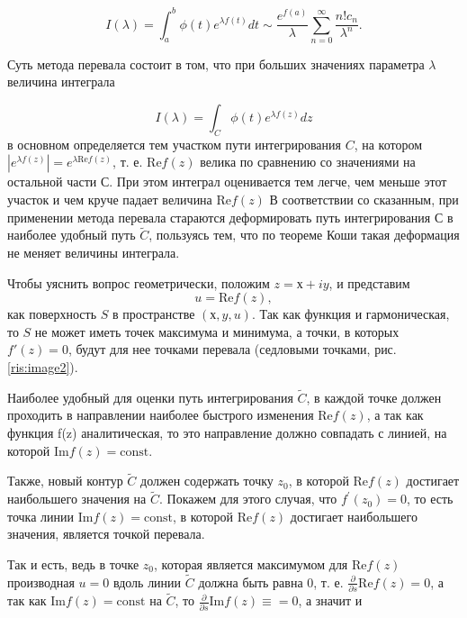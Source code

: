 \documentclass[%
bachelor,    %
natbib,      %
subf,        %
href,        %
colorlinks,  %
]{disser}
\renewcommand{\Re}{\mathrm{Re}}
\renewcommand{\Im}{\mathrm{Im}}
\newcommand{\const}{\mathrm{const}}
\begin{document}
\begin{equation}\label{eq:eq10}
I(\lambda) = \int_{a}^{b}\phi(t)e^{\lambda f(t)}dt \sim \frac{e^{f(a)}}{\lambda}\sum_{n=0}^{\infty}\frac{n! c_n}{\lambda^n}.
\end{equation}

Суть метода перевала состоит в том, что при больших значениях параметра $\lambda$ величина интеграла

$$
I(\lambda) = \int_{C}^{}\phi(t)e^{\lambda f(z)}dz
$$
в основном определяется тем участком пути интегрирования $C$, на котором $|e^{\lambda f(z)}|=e^{\lambda \Re f(z)}$, т. е. $\Re f(z)$ велика по сравнению со значениями на остальной части $С$. При этом интеграл оценивается тем легче, чем меньше этот участок и чем круче падает величина $\Re f(z)$ В соответствии со сказанным, при применении метода перевала стараются деформировать путь интегрирования С в наиболее удобный путь $\widetilde{C}$, пользуясь тем, что по теореме Коши такая деформация не меняет величины интеграла.\cite{Urmat}

Чтобы уяснить вопрос геометрически, положим $z = х + iy$, и представим
$$
u = \Re f(z),
$$
как поверхность $S$ в пространстве $(х, y, u)$. Так как функция и гармоническая, то $S$ не может иметь точек максимума и минимума, а точки, в которых $f'(z) = 0$, будут для нее точками перевала (седловыми точками, рис. \ref{ris:image2}).

	
	Наиболее удобный для оценки путь интегрирования $\widetilde{C}$, в каждой точке должен проходить в направлении наиболее быстрого изменения $\Re f(z)$, а так как функция f(z) аналитическая, то это направление должно совпадать с линией, на которой $\Im f(z) = \const$. 
	
	Также, новый контур $\widetilde{C}$ должен содержать точку $z_0$, в которой $\Re f(z)$ достигает наибольшего значения на $\widetilde{C}$. Покажем для этого случая, что $f^\prime (z_0) = 0$, то есть точка линии $\Im f(z) = \const$, в которой $\Re f (z)$ достигает наибольшего значения, является точкой перевала.
	
	Так и есть, ведь в точке $z_0$, которая является максимумом для $\Re f (z)$ производная $u=0$ вдоль линии $\widetilde{C}$ должна быть равна 0, т. е. $\frac{\partial}{\partial s}\Re f(z)=0$, а так как $\Im f(z) = \const$ на $\widetilde{C}$, то $\frac{\partial}{\partial s} \Im f(z) \equiv = 0$, а значит и 
	
\end{document}

